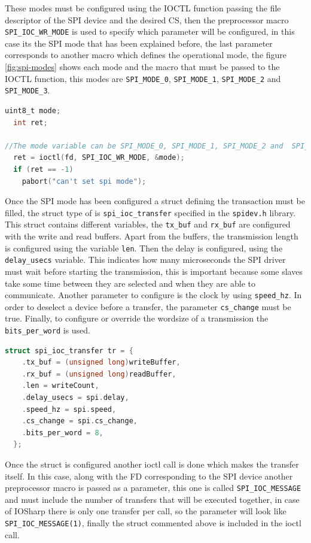 These modes must be configured using the \gls{IOCTL} function passing the file descriptor of the SPI device and the desired \gls{CS}, then the preprocessor macro \verb!SPI_IOC_WR_MODE! is used to specify which parameter will be configured, in this case its the SPI mode that has been explained before, the last parameter corresponds to another macro which defines the operational mode, the figure \ref{fig:spi-modes} shows each mode and the macro that must be passed to the \gls{IOCTL} function, this modes are \verb!SPI_MODE_0!, \verb!SPI_MODE_1!, \verb!SPI_MODE_2! and \verb!SPI_MODE_3!.

\begin{lstlisting}[language=C, caption={IOSharp.c - SPI Mode configuration}]
uint8_t mode;
  int ret;

//The mode variable can be SPI_MODE_0, SPI_MODE_1, SPI_MODE_2 and  SPI_MODE_3
  ret = ioctl(fd, SPI_IOC_WR_MODE, &mode);
  if (ret == -1)
    pabort("can't set spi mode");
\end{lstlisting}

Once the SPI mode has been configured a struct defining the transaction must be filled, the struct type of is \verb!spi_ioc_transfer! specified in the \verb!spidev.h! library. This struct contains different variables, the \verb!tx_buf! and \verb!rx_buf! are configured with the write and read buffers. Apart from the buffers, the transmission length is configured using the variable \verb!len!. Then the delay is configured, using the \verb!delay_usecs! variable. This indicates how many microseconds the SPI driver must wait before starting the transmission, this is important because some slaves take some time between they are selected and when they are able to communicate. Another parameter to configure is the clock by using \verb!speed_hz!. In order to deselect a device before a transfer, the parameter \verb!cs_change! must be true. Finally, to configure or override the wordsize of a transmission the \verb!bits_per_word! is used.

\begin{lstlisting}[language=C, caption={IOSharp.c - SPI struct configuration}]
struct spi_ioc_transfer tr = {
    .tx_buf = (unsigned long)writeBuffer,
    .rx_buf = (unsigned long)readBuffer,
    .len = writeCount,
    .delay_usecs = spi.delay,
    .speed_hz = spi.speed,
    .cs_change = spi.cs_change,
    .bits_per_word = 8,
  };
\end{lstlisting}

Once the struct is configured another ioctl call is done which makes the transfer itself. In this case, along with the \gls{FD} corresponding to the SPI device another preprocessor macro is passed as a parameter, this one is called \verb!SPI_IOC_MESSAGE! and must include the number of transfers that will be executed together, in case of IOSharp there is only one transfer per call, so the parameter will look like \verb!SPI_IOC_MESSAGE(1)!, finally the struct commented above is included in the ioctl call.

